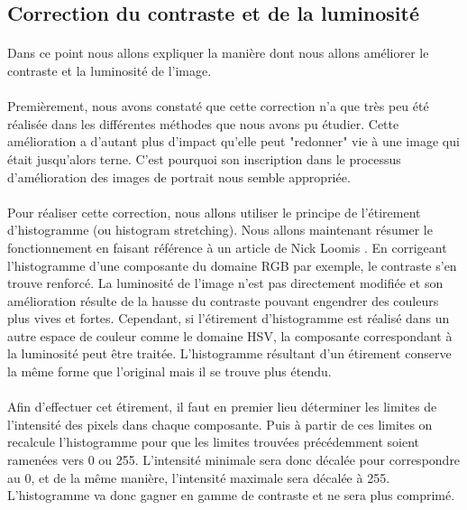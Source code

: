 \documentclass[11pt, french,screen]{report-rd-info}
\begin{document}
\subsection{Correction du contraste et de la luminosité}
\label{part:contraste}
\paragraph*{}
Dans ce point nous allons expliquer la manière dont nous allons améliorer le contraste et la luminosité de l'image. 
\paragraph*{}
Premièrement, nous avons constaté que cette correction n'a que très peu été réalisée dans les différentes méthodes que nous avons pu étudier. Cette amélioration a d'autant plus d'impact qu'elle peut "redonner" vie à une image qui était jusqu'alors terne. C'est pourquoi son inscription dans le processus d'amélioration des images de portrait nous semble appropriée.
\paragraph*{}
Pour réaliser cette correction, nous allons utiliser le principe de l'étirement d'histogramme (ou histogram stretching). Nous allons maintenant résumer le fonctionnement en faisant référence à un article de Nick Loomis \cite{Loomis2013}. En corrigeant l'histogramme d'une composante du domaine RGB par exemple, le contraste s'en trouve renforcé. La luminosité de l'image n'est pas directement modifiée et son amélioration résulte de la hausse du contraste pouvant engendrer des couleurs plus vives et fortes. Cependant, si l'étirement d'histogramme est réalisé dans un autre espace de couleur comme le domaine HSV, la composante correspondant à la luminosité peut être traitée. L'histogramme résultant d'un étirement conserve la même forme que l'original mais il se trouve plus étendu.
\paragraph*{}
Afin d'effectuer cet étirement, il faut en premier lieu déterminer les limites de l'intensité des pixels dans chaque composante. Puis à partir de ces limites on recalcule l'histogramme pour que les limites trouvées précédemment soient ramenées vers 0 ou 255. L'intensité minimale sera donc décalée pour correspondre au 0, et de la même manière, l'intensité maximale sera décalée à 255. L'histogramme va donc gagner en gamme de contraste et ne sera plus comprimé.
\end{document}
